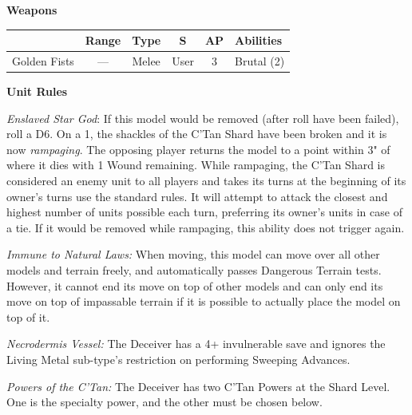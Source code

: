 \begin{minipage}[t]{0.72\textwidth}
	\vspace*{2em}
	\textbf{Weapons}
	
	\begin{tabular}{m{95 pt} *{4}{c} >{\raggedright\arraybackslash}p{130pt}}
		& Range & Type & S & AP & Abilities \\
		\hline
		Golden Fists & — & Melee & User & 3 & Brutal (2) \\
	\end{tabular}
	
	\vspace*{2em}
	\textbf{Unit Rules}
	
	\textit{Enslaved Star God}: If this model would be removed (after  roll have been failed), roll a D6. On a 1, the shackles of the C'Tan Shard have been broken and it is now \textit{rampaging}. The opposing player returns the model to a point within 3" of where it dies with 1 Wound remaining. While rampaging, the C'Tan Shard is considered an enemy unit to all players and takes its turns at the beginning of its owner's turns use the standard rules. It will attempt to attack the closest and highest number of units possible each turn, preferring its owner's units in case of a tie. If it would be removed while rampaging, this ability does not trigger again.
	
	\textit{Immune to Natural Laws:} When moving, this model can move over all other models and terrain freely, and automatically passes Dangerous Terrain tests. However, it cannot end its move on top of other models and can only end its move on top of impassable terrain if it is possible to actually place the model on top of it.
		
	\textit{Necrodermis Vessel:} The Deceiver has a 4+ invulnerable save and ignores the Living Metal sub-type's restriction on performing Sweeping Advances.
	
	\textit{Powers of the C'Tan:} The Deceiver has two C'Tan Powers at the Shard Level. One is the  specialty power, and the other must be chosen below.
	

\end{minipage}
